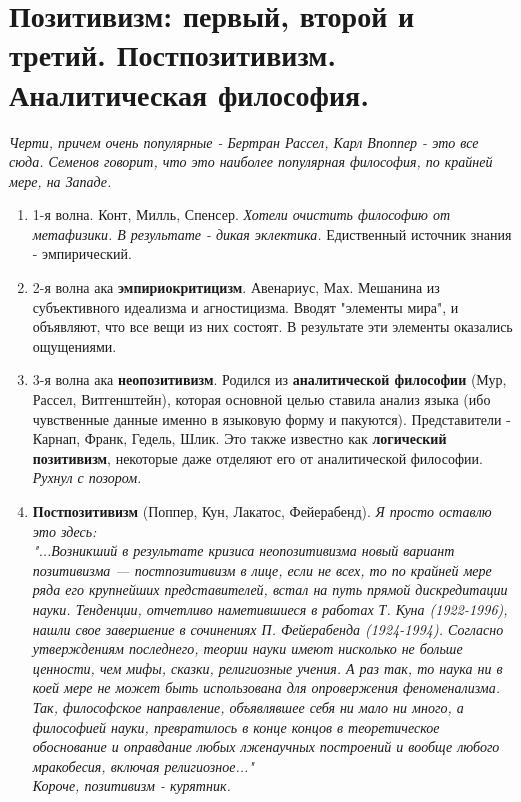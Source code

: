 \documentclass[12pt,a4paper]{article}
\begin{document}
\section{Позитивизм: первый, второй и третий. Постпозитивизм. Аналитическая философия.}
\textit{Черти, причем очень популярные - Бертран Рассел, Карл Впоппер - это все сюда. Семенов говорит, что это наиболее популярная философия, по крайней мере, на Западе.}
\begin{enumerate}

\item 1-я волна. Конт, Милль, Спенсер.
\textit{Хотели очистить философию от метафизики. В результате - дикая эклектика.} Едиственный источник знания - эмпирический.
\item 2-я волна ака \textbf{эмпириокритицизм}. Авенариус, Мах.
Мешанина из субъективного идеализма и агностицизма. Вводят "элементы мира", и объявляют, что все вещи из них состоят. В результате эти элементы оказались ощущениями.
\item 3-я волна ака \textbf{неопозитивизм}. Родился из \textbf{аналитической философии} (Мур, Рассел, Витгенштейн), которая основной целью ставила  анализ языка (ибо чувственные данные именно в языковую форму и пакуются). Представители - Карнап, Франк, Гедель, Шлик. Это также известно как \textbf{логический позитивизм}, некоторые даже отделяют его от аналитической философии. \textit{Рухнул с позором}.
\item \textbf{Постпозитивизм} (Поппер, Кун, Лакатос, Фейерабенд).
\textit{Я просто оставлю это здесь:\\
"...Возникший в результате кризиса неопозитивизма новый вариант позитивизма —
постпозитивизм в лице, если не всех, то по крайней мере ряда его крупнейших
представителей, встал на путь прямой дискредитации науки. Тенденции, отчетливо
наметившиеся в работах Т. Куна (1922-1996), нашли свое завершение в сочинениях
П. Фейерабенда (1924-1994). Согласно утверждениям последнего, теории науки
имеют нисколько не больше ценности, чем мифы, сказки, религиозные учения. А
раз так, то наука ни в коей мере не может быть использована для опровержения
феноменализма. Так, философское направление, объявлявшее себя ни мало ни
много, а философией науки, превратилось в конце концов в теоретическое
обоснование и оправдание любых лженаучных построений и вообще любого
мракобесия, включая религиозное..."\\
Короче, позитивизм - курятник.
}
\end{enumerate}
\end{document}
